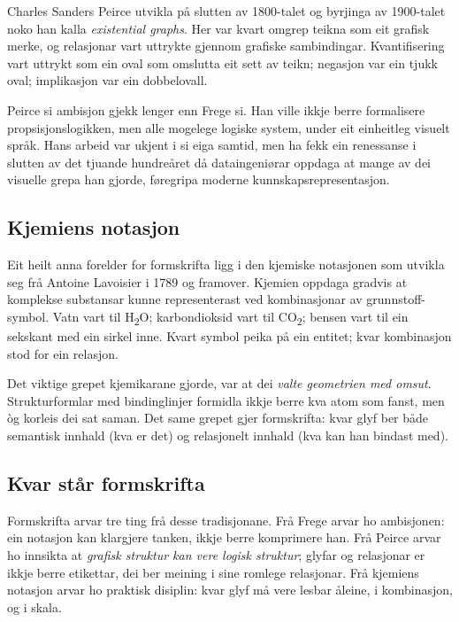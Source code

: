 \documentclass[a4paper,11pt]{article}
\begin{document}
Charles Sanders Peirce utvikla på slutten av 1800-talet og byrjinga av 1900-talet noko han kalla \emph{existential graphs}. Her var kvart omgrep teikna som eit grafisk merke, og relasjonar vart uttrykte gjennom grafiske sambindingar. Kvantifisering vart uttrykt som ein oval som omslutta eit sett av teikn; negasjon var ein tjukk oval; implikasjon var ein dobbelovall.

Peirce si ambisjon gjekk lenger enn Frege si. Han ville ikkje berre formalisere propsisjonslogikken, men alle mogelege logiske system, under eit einheitleg visuelt språk. Hans arbeid var ukjent i si eiga samtid, men ha fekk ein renessanse i slutten av det tjuande hundreåret då dataingeniørar oppdaga at mange av dei visuelle grepa han gjorde, føregripa moderne kunnskapsrepresentasjon.

\subsection{Kjemiens notasjon}

Eit heilt anna forelder for formskrifta ligg i den kjemiske notasjonen som utvikla seg frå Antoine Lavoisier i 1789 og framover. Kjemien oppdaga gradvis at komplekse substansar kunne representerast ved kombinasjonar av grunnstoff-symbol. Vatn vart til H\textsubscript{2}O; karbondioksid vart til CO\textsubscript{2}; bensen vart til ein sekskant med ein sirkel inne. Kvart symbol peika på ein entitet; kvar kombinasjon stod for ein relasjon.

Det viktige grepet kjemikarane gjorde, var at dei \emph{valte geometrien med omsut}. Strukturformlar med bindinglinjer formidla ikkje berre kva atom som fanst, men òg korleis dei sat saman. Det same grepet gjer formskrifta: kvar glyf ber både semantisk innhald (kva er det) og relasjonelt innhald (kva kan han bindast med).

\subsection{Kvar står formskrifta}

Formskrifta arvar tre ting frå desse tradisjonane. Frå Frege arvar ho ambisjonen: ein notasjon kan klargjere tanken, ikkje berre komprimere han. Frå Peirce arvar ho innsikta at \emph{grafisk struktur kan vere logisk struktur}; glyfar og relasjonar er ikkje berre etikettar, dei ber meining i sine romlege relasjonar. Frå kjemiens notasjon arvar ho praktisk disiplin: kvar glyf må vere lesbar åleine, i kombinasjon, og i skala.
\end{document}
